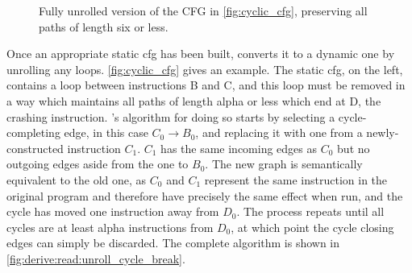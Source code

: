 \addtocounter{figure}{1}
\begin{wrapfigure}{o}{3.9cm}
\vspace{-19pt}
\begin{figgure}
\vspace{-2pt}
\caption{Fully unrolled version of the CFG in
  \autoref{fig:cyclic_cfg}, preserving all paths of length six or
  less.}
\label{fig:unrolled_cyclic_cfg}
\vspace{-4pt}
\end{figgure}
\vspace{-8pt}
\end{wrapfigure}
\addtocounter{figure}{-2}
Once an appropriate \gls{static cfg} has been built, {\technique}
converts it to a dynamic one by unrolling any loops.
\autoref{fig:cyclic_cfg} gives an example.  The \gls{static cfg}, on
the left, contains a loop between instructions B and C, and this loop
must be removed in a way which maintains all paths of length
\gls{alpha} or less which end at D, the \gls{crashing instruction}.
    {\Technique}'s algorithm for doing so starts by selecting a
    cycle-completing edge, in this case $C_0{\rightarrow}B_0$, and
    replacing it with one from a newly-constructed instruction $C_1$.
    $C_1$ has the same incoming edges as $C_0$ but no outgoing edges
    aside from the one to $B_0$.  The new graph is semantically
    equivalent to the old one, as $C_0$ and $C_1$ represent the same
    instruction in the original program and therefore have precisely
    the same effect when run, and the cycle has moved one instruction
    away from $D_0$.  The process repeats until all cycles are at
    least \gls{alpha} instructions from $D_0$, at which point the
    cycle closing edges can simply be discarded.  The complete
    algorithm is shown in
    \autoref{fig:derive:read:unroll_cycle_break}.

